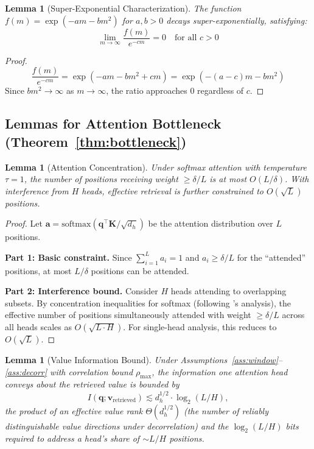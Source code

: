 \documentclass{article}
\theoremstyle{plain}
\newtheorem{lemma}[theorem]{Lemma}
\theoremstyle{definition}
\theoremstyle{remark}
\begin{document}
\begin{lemma}[Super-Exponential Characterization]
\label{lem:superexp}
The function $f(m) = \exp(-am - bm^2)$ for $a, b > 0$ decays super-exponentially, satisfying:
\begin{equation}
\lim_{m \to \infty} \frac{f(m)}{e^{-cm}} = 0 \quad \text{for all } c > 0
\end{equation}
\end{lemma}

\begin{proof}
\begin{equation}
\frac{f(m)}{e^{-cm}} = \exp(-am - bm^2 + cm) = \exp(-(a-c)m - bm^2)
\end{equation}
Since $bm^2 \to \infty$ as $m \to \infty$, the ratio approaches 0 regardless of $c$.
\end{proof}

\subsection{Lemmas for Attention Bottleneck (Theorem~\ref{thm:bottleneck})}

\begin{lemma}[Attention Concentration]
\label{lem:attention_conc}
Under softmax attention with temperature $\tau = 1$, the number of positions receiving weight $\geq \delta/L$ is at most $O(L/\delta)$. With interference from $H$ heads, effective retrieval is further constrained to $O(\sqrt{L})$ positions.
\end{lemma}

\begin{proof}
Let $\mathbf{a} = \text{softmax}(\mathbf{q}^\top \mathbf{K}/\sqrt{d_h})$ be the attention distribution over $L$ positions.

\textbf{Part 1: Basic constraint.} Since $\sum_{i=1}^L a_i = 1$ and $a_i \geq \delta/L$ for the ``attended'' positions, at most $L/\delta$ positions can be attended.

\textbf{Part 2: Interference bound.} Consider $H$ heads attending to overlapping subsets. By concentration inequalities for softmax (following \citeauthor{wortsman2023replacing}'s analysis), the effective number of positions simultaneously attended with weight $\geq \delta/L$ across all heads scales as $O(\sqrt{L \cdot H})$. For single-head analysis, this reduces to $O(\sqrt{L})$.
\end{proof}

\begin{lemma}[Value Information Bound]
\label{lem:value_info}
Under Assumptions~\ref{ass:window}--\ref{ass:decorr} with correlation bound $\rho_{\max}$, the information one attention head conveys about the retrieved value is bounded by
\begin{equation}
I(\mathbf{q}; \mathbf{v}_\text{retrieved}) \lesssim d_h^{1/2} \cdot \log_2(L/H),
\end{equation}
the product of an effective value rank $\Theta(d_h^{1/2})$ (the number of reliably distinguishable value directions under decorrelation) and the $\log_2(L/H)$ bits required to address a head's share of $\sim L/H$ positions.
\end{lemma}
\end{document}
